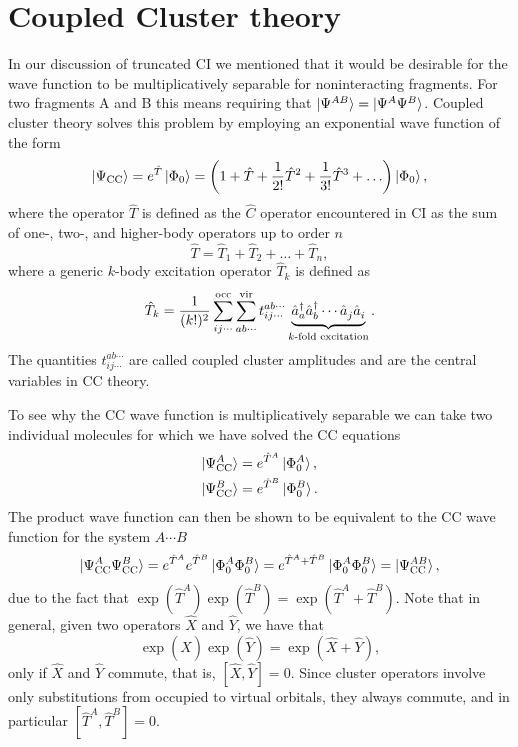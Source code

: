 \documentclass[../Main/chem532-notes.tex]{subfiles}
\begin{document}
\section{Coupled Cluster theory}
In our discussion of truncated CI we mentioned that it would be desirable for the wave function to be multiplicatively separable for noninteracting fragments. For two fragments A and B this means requiring that $\ket{\Psi^{AB}} = \ket{\Psi^A\Psi^B}$.
Coupled cluster theory solves this problem by employing an exponential wave function of the form
\begin{equation}
\ket{\Psi_{\mathrm{CC}}} = e^{\hat{T}} \ket{\Phi_0}
= \left(1 + \hat{T} + \frac{1}{2!}\hat{T}^2+ \frac{1}{3!}\hat{T}^3 + \ldots \right)\ket{\Phi_0},
\end{equation}
where the operator $\hat{T}$ is defined as the $\hat{C}$ operator encountered in CI as the sum of one-, two-, and higher-body operators up to order $n$
\begin{equation}
\hat{T} = \hat{T}_1 + \hat{T}_2 + \ldots + \hat{T}_n,
\end{equation}
where a generic $k$-body excitation operator $\hat{T}_k$ is defined as
\begin{equation}
 \hat{T}_k = \frac{1}{(k!)^2} \sum_{ij\cdots}^{\mathrm{occ}} \sum_{ab\cdots}^{\mathrm{vir}} t_{ij\cdots}^{ab\cdots} \underbrace{\hat{a}_{a}^{\dagger} \hat{a}_{b}^{\dagger} \cdots \hat{a}_{j}^{\,} \hat{a}_{i}^{\,}}_{k\text{-fold excitation}}.
\end{equation}
The quantities $t_{ij\cdots}^{ab\cdots}$ are called coupled cluster amplitudes and are the central variables in CC theory.

To see why the CC wave function is multiplicatively separable we can take two individual molecules for which we have solved the CC equations
\begin{align}
\ket{\Psi_{\mathrm{CC}}^A} & = e^{\hat{T}^A} \ket{\Phi_0^A},\\
\ket{\Psi_{\mathrm{CC}}^B} & = e^{\hat{T}^B} \ket{\Phi_0^B}.
\end{align}
The product wave function can then be shown to be equivalent to the CC wave function for the system $A\cdots B$
\begin{align}
\ket{\Psi_{\mathrm{CC}}^A \Psi_{\mathrm{CC}}^B} = e^{\hat{T}^A} e^{\hat{T}^B}\ket{\Phi_0^A\Phi_0^B}
= e^{\hat{T}^A+\hat{T}^B}\ket{\Phi_0^A\Phi_0^B}
= \ket{\Psi_{\mathrm{CC}}^{AB}},
\end{align}
due to the fact that $\exp(\hat{T}^A)\exp(\hat{T}^B) = \exp(\hat{T}^A + \hat{T}^B)$.
Note that in general, given two operators $\hat{X}$ and $\hat{Y}$, we have that
\begin{equation}
\exp(\hat{X})\exp(\hat{Y}) = \exp(\hat{X} + \hat{Y}),
\end{equation}
only if $\hat{X}$ and $\hat{Y}$ commute, that is, $[\hat{X},\hat{Y}] = 0$.
Since cluster operators involve only substitutions from occupied to virtual orbitals, they always commute, and in particular $[\hat{T}^A,\hat{T}^B] = 0$.
\end{document}
